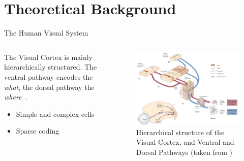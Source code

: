 \documentclass{beamer}
\begin{document}
    \section{Theoretical Background}
    \begin{frame}{The Human Visual System}
        \begin{columns}
            \begin{column}{0.48\textwidth}
                The Visual Cortex is mainly hierarchically structured.
                The ventral pathway encodes the \textit{what}, the dorsal pathway the \textit{where}~\cite{goodale1992separate}.

                \begin{itemize}
                    \item Simple and complex cells
                    \item Sparse coding
                \end{itemize}
            \end{column}
            \begin{column}{0.48\textwidth}
                \begin{figure}
                    \centering
                    \includegraphics[width=\textwidth]{pres_imgs/ventral_dorsal.png}
                    \caption{Hierarchical structure of the Visual Cortex, and Ventral and Dorsal Pathways (taken from \cite[p. 571]{mack2013principles})}
                    \label{fig:figure_ventral_dorsal}
                \end{figure}
            \end{column}
        \end{columns}
    \end{frame}
\end{document}
